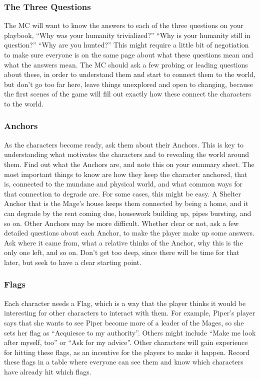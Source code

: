 \documentclass[
]{article}
\begin{document}
\hypertarget{the-three-questions}{%
\subsubsection{The Three Questions}\label{the-three-questions}}

The MC will want to know the answers to each of the three questions on
your playbook, ``Why was your humanity trivialized?'' ``Why is your
humanity still in question?'' ``Why are you hunted?'' This might require
a little bit of negotiation to make sure everyone is on the same page
about what these questions mean and what the answers mean. The MC should
ask a few probing or leading questions about these, in order to
understand them and start to connect them to the world, but don't go too
far here, leave things unexplored and open to changing, because the
first scenes of the game will fill out exactly how these connect the
characters to the world.

\hypertarget{anchors-9}{%
\subsubsection{Anchors}\label{anchors-9}}

As the characters become ready, ask them about their Anchors. This is
key to understanding what motivates the characters and to revealing the
world around them. Find out what the Anchors are, and note this on your
summary sheet. The most important things to know are how they keep the
character anchored, that is, connected to the mundane and physical
world, and what common ways for that connection to degrade are. For some
cases, this might be easy. A Shelter Anchor that is the Mage's house
keeps them connected by being a home, and it can degrade by the rent
coming due, housework building up, pipes bursting, and so on. Other
Anchors may be more difficult. Whether clear or not, ask a few detailed
questions about each Anchor, to make the player make up some answers.
Ask where it came from, what a relative thinks of the Anchor, why this
is the only one left, and so on. Don't get too deep, since there will be
time for that later, but seek to have a clear starting point.

\hypertarget{flags}{%
\subsubsection{Flags}\label{flags}}

Each character needs a Flag, which is a way that the player thinks it
would be interesting for other characters to interact with them. For
example, Piper's player says that she wants to see Piper become more of
a leader of the Mages, so she sets her flag as ``Acquiesce to my
authority''. Others might include ``Make me look after myself, too'' or
``Ask for my advice''. Other characters will gain experience for hitting
these flags, as an incentive for the players to make it happen. Record
these flags in a table where everyone can see them and know which
characters have already hit which flags.
\end{document}

